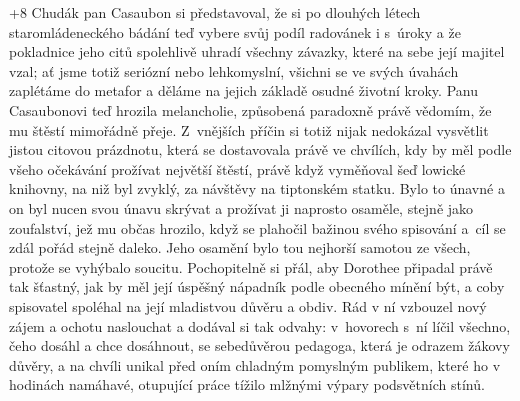 \looseness+8
Chudák pan Casaubon si představoval, že si po dlouhých létech staromládeneckého bádání teď vybere svůj podíl radovánek i s úroky a že pokladnice jeho citů spolehlivě uhradí všechny závazky, které na sebe její majitel vzal; ať jsme totiž seriózní nebo lehkomyslní, všichni se ve svých úvahách zaplétáme do metafor a děláme na jejich základě osudné životní kroky. Panu Casaubonovi teď hrozila melancholie, způsobená paradoxně právě vědomím, že mu štěstí mimořádně přeje. Z vnějších příčin si totiž nijak nedokázal vysvětlit jistou citovou prázdnotu, která se dostavovala právě ve chvílích, kdy by měl podle všeho očekávání prožívat největší štěstí, právě když vyměňoval šeď lowické knihovny, na niž byl zvyklý, za návštěvy na tiptonském statku. Bylo to únavné a on byl nucen svou únavu skrývat a prožívat ji naprosto osaměle, stejně jako zoufalství, jež mu občas hrozilo, když se plahočil bažinou svého spisování a cíl se zdál pořád stejně daleko. Jeho osamění bylo tou nejhorší samotou ze všech, protože se vyhýbalo soucitu. Pochopitelně si přál, aby Dorothee připadal právě tak šťastný, jak by měl její úspěšný nápadník podle obecného mínění být, a coby spisovatel spoléhal na její mladistvou důvěru a obdiv. Rád v ní vzbouzel nový zájem a ochotu naslouchat a dodával si tak odvahy: v hovorech s ní líčil všechno, čeho dosáhl a chce dosáhnout, se sebedůvěrou pedagoga, která je odrazem žákovy důvěry, a na chvíli unikal před oním chladným pomyslným publikem, které ho v hodinách namáhavé, otupující práce tížilo mlžnými výpary podsvětních stínů.
